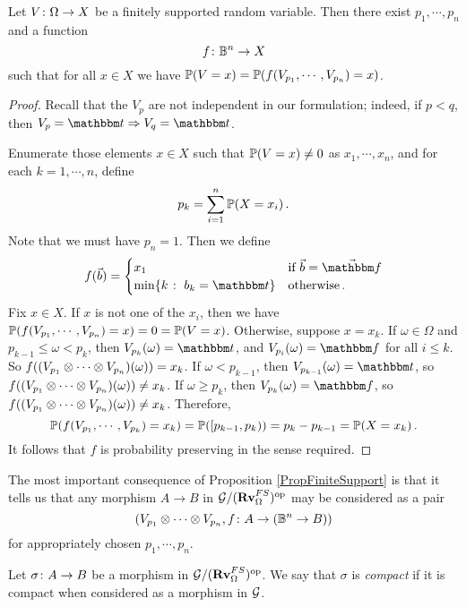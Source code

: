 \begin{proposition}
  Let $V\colon \Omega \to X$ be a finitely supported random variable.  
  Then there exist $p_1,\cdots,p_n$ and a function
  \[
    f \colon \mathbb{B}^n \to X
    \]
  such that for all $x\in X$ we have $\mathbb{P}(V = x) = \mathbb{P}(f(V_{p_1},\cdots,V_{p_n}) = x)$.
  \label{PropFiniteSupport}
\end{proposition}
\begin{proof}
  Recall that the $V_p$ are not independent in our formulation; indeed, if $p<q$, then $V_p = \true \Rightarrow V_q = \true$.

  Enumerate those elements $x\in X$ such that $\mathbb{P}(V = x) \ne 0$ as $x_1,\cdots,x_n$, and for each $k = 1,\cdots,n$, define
  \[
    p_k = \sum_{i=1}^n \mathbb{P}(X = x_i)\,.
    \]
  Note that we must have $p_n = 1$.  
  Then we define
  \[
    f(\vec{b}) = \begin{cases}
      x_1 & \text{if $\vec{b} = \vec{\false}$} \\
      \min\{k \suchthat b_k = \true\} & \text{otherwise}\,.
    \end{cases}
    \]
  Fix $x\in X$.  
  If $x$ is not one of the $x_i$, then we have $\mathbb{P}(f(V_{p_1},\cdots,V_{p_n}) = x) = 0 = \mathbb{P}(V = x)$.  
  Otherwise, suppose $x = x_k$.  
  If $\omega\in\Omega$ and $p_{k-1}\le\omega<p_k$, then $V_{p_k}(\omega) = \true$, and $V_{p_i}(\omega) = \false$ for all $i \le k$.  
  So $f((V_{p_1}\otimes\cdots\otimes V_{p_n})(\omega)) = x_k$.
  If $\omega<p_{k-1}$, then $V_{p_{k-1}}(\omega) = \true$, so $f((V_{p_1}\otimes\cdots\otimes V_{p_n})(\omega)) \ne x_k$.
  If $\omega\ge p_k$, then $V_{p_k}(\omega) = \false$, so $f((V_{p_1}\otimes\cdots\otimes V_{p_n})(\omega)) \ne x_k$.  
  Therefore, 
  \[
    \mathbb{P}(f(V_{p_1},\cdots,V_{p_k}) = x_k) = \mathbb{P}([p_{k-1},p_k)) = p_k - p_{k-1} = \mathbb{P}(X = x_k)\,.
    \]
  It follows that $f$ is probability preserving in the sense required.
\end{proof}

The most important consequence of Proposition \ref{PropFiniteSupport} is that it tells us that any morphism $A\to B$ in $\mathcal G/({\normalfont\textbf{Rv}}_{\Omega}^{FS})^{\mathrm{op}}$ may be considered as a pair 
\[
  (V_{p_1}\otimes\cdots\otimes V_{p_n},f \colon A \to (\mathbb{B}^n \to B))
  \]
for appropriately chosen $p_1,\cdots,p_n$.

\begin{definition}
  Let $\sigma\colon A \to B$ be a morphism in $\mathcal G/({\normalfont\textbf{Rv}}_{\Omega}^{FS})^{\mathrm{op}}$.  
  We say that $\sigma$ is \emph{compact} if it is compact when considered as a morphism in $\mathcal G$.
\end{definition}

